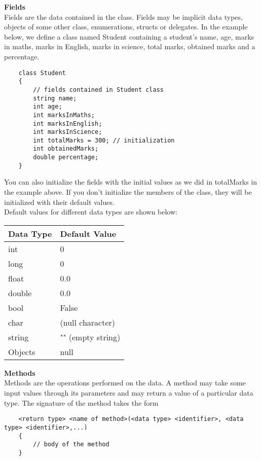 \textbf{Fields}\\

Fields are the data contained in the class. Fields may be implicit data types, objects of some other class,
enumerations, structs or delegates. In the example below, we define a class named Student containing a student’s
name, age, marks in maths, marks in English, marks in science, total marks, obtained marks and a percentage.

\begin{lstlisting}
    class Student
    {
        // fields contained in Student class
        string name;
        int age;
        int marksInMaths;
        int marksInEnglish;
        int marksInScience;
        int totalMarks = 300; // initialization
        int obtainedMarks;
        double percentage;
    }        
\end{lstlisting}

You can also initialize the fields with the initial values as we did in totalMarks in the example above. If you don’t
initialize the members of the class, they will be initialized with their default values.\\

Default values for different data types are shown below:

\begin{center}
    \begin{tabular}{ | m{5em} | m{10cm} | } 
    \hline
    Data Type & Default Value \\
    \hline
    int & 0\\
    long & 0\\
    float & 0.0\\
    double & 0.0\\
    bool & False\\
    char & (null character)\\
    string & "" (empty string)\\
    Objects & null\\
    \hline
    \end{tabular}
\end{center}


\textbf{Methods}\\

Methods are the operations performed on the data. A method may take some input values through its parameters
and may return a value of a particular data type. The signature of the method takes the form

\begin{lstlisting}
    <return type> <name of method>(<data type> <identifier>, <data type> <identifier>,...)
    {
        // body of the method
    }    
\end{lstlisting}

